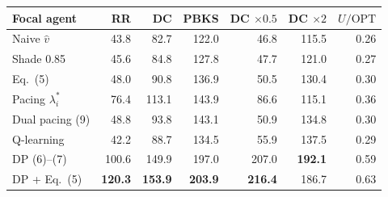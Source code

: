 \begin{tabular}{@{}lrrrrrr@{}}\toprule
Focal agent & RR & DC & PBKS & DC $\times0.5$ & DC $\times2$ & $U/\mathrm{OPT}$\\\midrule
Naive $\hat v$ & 43.8 & 82.7 & 122.0 & 46.8 & 115.5 & 0.26\\
Shade 0.85 & 45.6 & 84.8 & 127.8 & 47.7 & 121.0 & 0.27\\
Eq.~(5) & 48.0 & 90.8 & 136.9 & 50.5 & 130.4 & 0.30\\
Pacing $\lambda^*_i$ & 76.4 & 113.1 & 143.9 & 86.6 & 115.1 & 0.36\\
Dual pacing (9) & 48.8 & 93.8 & 143.1 & 50.9 & 134.8 & 0.30\\
Q-learning & 42.2 & 88.7 & 134.5 & 55.9 & 137.5 & 0.29\\
DP (6)--(7) & 100.6 & 149.9 & 197.0 & 207.0 & \textbf{192.1} & 0.59\\
DP + Eq.~(5) & \textbf{120.3} & \textbf{153.9} & \textbf{203.9} & \textbf{216.4} & 186.7 & 0.63\\
\bottomrule\end{tabular}
